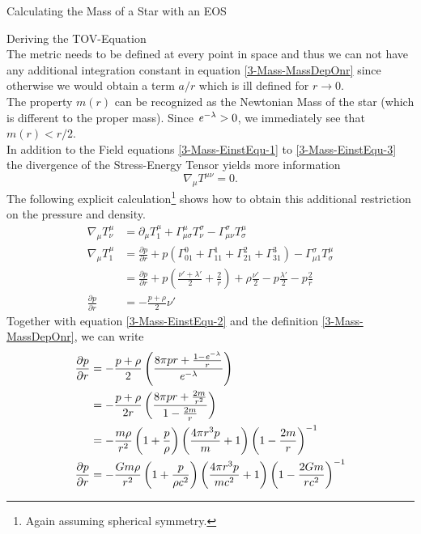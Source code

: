 \begin{section}{Calculating the Mass of a Star with an EOS}
\begin{subsection}{Deriving the TOV-Equation}
\begin{equation}
	\label{3-Mass-MassDepOnr}
\end{equation}
The metric needs to be defined at every point in space and thus we can not have any additional integration constant in equation \eqref{3-Mass-MassDepOnr} since otherwise we would obtain a term $a/r$ which is ill defined for $r\rightarrow0$.\\
The property $m(r)$ can be recognized as the Newtonian Mass of the star (which is different to the proper mass). Since $\mathit{e}^{-\lambda}>0$, we immediately see that $m(r)<r/2$.\\
In addition to the Field equations \ref{3-Mass-EinstEqu-1} to \ref{3-Mass-EinstEqu-3} the divergence of the Stress-Energy Tensor yields more information
\begin{equation}
	\nabla_\mu T^{\mu\nu}=0.
\end{equation}
The following explicit calculation\footnote{Again assuming spherical symmetry.} shows how to obtain this additional restriction on the pressure and density.
\begin{align}
	\nabla_\mu T^\mu_\nu 	&= \partial_\mu T^\mu_1 + \Gamma^\mu_{\mu\sigma}T^\sigma_\nu-\Gamma^\sigma_{\mu\nu}T^\mu_\sigma\\
	\nabla_\mu T^\mu_1		&= \frac{\partial p}{\partial r} + p\left(\Gamma^0_{01}+\Gamma^1_{11}+\Gamma^2_{21}+\Gamma^3_{31} \right) - \Gamma^\sigma_{\mu 1}T^\mu_\sigma\\
							&= \frac{\partial p}{\partial r} + p\left(\frac{\nu'+\lambda'}{2} + \frac{2}{r}\right) + \rho\frac{\nu'}{2} - p\frac{\lambda'}{2} - p\frac{2}{r}\\
	\frac{\partial p}{\partial r} &= -\frac{p+\rho}{2}\nu'
\end{align}
Together with equation \ref{3-Mass-EinstEqu-2} and the definition \ref{3-Mass-MassDepOnr}, we can write
\begin{align}
	\frac{\partial p}{\partial r} 	&= -\frac{p+\rho}{2}\left(\frac{8\pi pr + \frac{1-\mathit{e}^{-\lambda}}{r}}{\mathit{e}^{-\lambda}} \right)\\
									&= -\frac{p+\rho}{2r}\left(\frac{8\pi pr+ \frac{2m}{r^2}}{1-\frac{2m}{r}} \right)\\
									&= -\frac{m\rho}{r^2}\left(1+\frac{p}{\rho}\right)\left(\frac{4\pi r^3p}{m}+1\right)\left(1-\frac{2m}{r}\right)^{-1}\\
	\frac{\partial p}{\partial r} 	&= -\frac{Gm\rho}{r^2}\left(1+\frac{p}{\rho c^2}\right)\left(\frac{4\pi r^3p}{mc^2}+1\right)\left(1-\frac{2Gm}{rc^2}\right)^{-1}
	\label{3-Mass-TOV-Eq-1}
\end{align}

\end{subsection}
\end{section}
